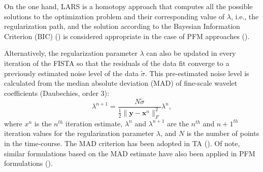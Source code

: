 On the one hand, LARS is a homotopy approach that computes all the possible solutions to the optimization problem and their corresponding value of $\lambda$, i.e., the regularization path, and the solution according to the Bayesian Information Criterion (BIC) (\citealt{Schwarz1978EstimatingDimensionModel}) is considered appropriate in the case of PFM approaches (\citealt{Gaudes2013Paradigmfreemapping,CaballeroGaudes2019deconvolutionalgorithmmulti}). 

Alternatively, the regularization parameter $\lambda$ can also be updated in every iteration of the FISTA so that the residuals of the data fit converge to a previously estimated noise level of the data $\tilde{\sigma}$. This pre-estimated noise level is calculated from the median absolute deviation (MAD) of fine-scale wavelet coefficients (Daubechies, order 3):
\begin{equation}
    \lambda^{n+1} = \frac{N \tilde{\sigma}}{\frac{1}{2} \| \mathbf{y} - \mathbf{x}^n \|_F^2} \lambda^n,
\label{eq:std}
\end{equation}
where $x^n$ is the $n^{th}$ iteration estimate, $\lambda^n$ and $\lambda^{n+1}$ are the $n^{th}$ and $n+1^{th}$ iteration values for the regularization parameter $\lambda$, and $N$ is the number of points in the time-course. The MAD criterion has been adopted in TA (\citealt{Karahanoglu2013TotalactivationfMRI}). Of note, similar formulations based on the MAD estimate have also been applied in PFM formulations (\citealt{Gaudes2012Structuredsparsedeconvolution,Gaudes2011MorphologicalPFM}).

